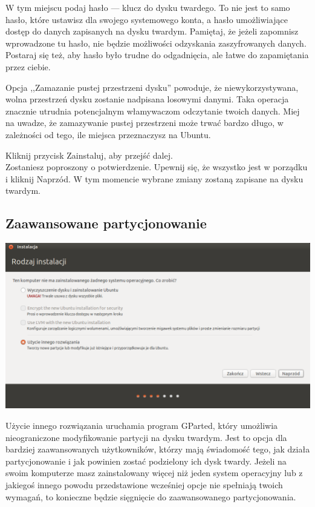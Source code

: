 W tym miejscu podaj hasło --- klucz do dysku twardego. To nie jest to samo hasło, które ustawisz dla swojego systemowego konta, a hasło umożliwiające dostęp do danych zapisanych na dysku twardym. Pamiętaj, że jeżeli zapomnisz wprowadzone tu hasło, nie będzie możliwości odzyskania zaszyfrowanych danych. Postaraj się też, aby hasło było trudne do odgadnięcia, ale łatwe do zapamiętania przez ciebie.

Opcja ,,Zamazanie pustej przestrzeni dysku'' powoduje, że niewykorzystywana, wolna przestrzeń dysku zostanie nadpisana losowymi danymi. Taka operacja znacznie utrudnia potencjalnym włamywaczom odczytanie twoich danych. Miej na uwadze, że zamazywanie pustej przestrzeni może trwać bardzo długo, w zależności od tego, ile miejsca przeznaczysz na Ubuntu.
\begin{flushright}
Kliknij przycisk \textcolor{ubuntu_orange}{Zainstaluj}, aby przejść dalej.\\
Zostaniesz poproszony o potwierdzenie. Upewnij się, że wszystko jest w porządku i kliknij \textcolor{ubuntu_orange}{Naprzód}.
W tym momencie wybrane zmiany zostaną zapisane na dysku twardym.\\
\end{flushright}
\clearpage
\subsection{Zaawansowane partycjonowanie}
\begin{center}
        \includegraphics[width=\linewidth]{images/instalator_partycjonowanie_gparted1.png}
\end{center}

\textcolor{ubuntu_orange}{Użycie innego rozwiązania} uruchamia program GParted, który umożliwia nieograniczone modyfikowanie partycji na dysku twardym. Jest to opcja dla bardziej zaawansowanych użytkowników, którzy mają świadomość tego, jak działa partycjonowanie i jak powinien zostać podzielony ich dysk twardy. Jeżeli na swoim komputerze masz zainstalowany więcej niż jeden system operacyjny lub z jakiegoś innego powodu przedstawione wcześniej opcje nie spełniają twoich wymagań, to konieczne będzie sięgnięcie do zaawansowanego partycjonowania.

